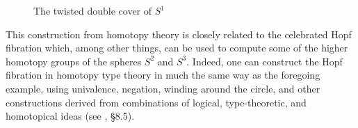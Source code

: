 \documentclass[11pt]{article}
\begin{document}
\begin{figure}\centering
  \caption{The twisted double cover of $S^1$}\label{fig:winding}
\end{figure}
%
This construction from homotopy theory is closely related to the celebrated Hopf fibration which, among other things, can be used to compute some of the higher homotopy groups of the spheres $S^2$ and $S^3$.  Indeed, one can construct the Hopf fibration in homotopy type theory in much the same way as the foregoing example, using univalence, negation, winding around the circle, and other constructions derived from combinations of logical, type-theoretic, and homotopical ideas (see \cite{HoTTbook}, \S 8.5). 

\end{document}
